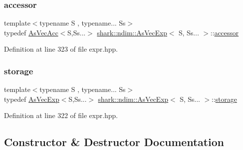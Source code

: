 \subsubsection{\texorpdfstring{accessor}{accessor}}
{\footnotesize\ttfamily template$<$typename S , typename... Ss$>$ \\
typedef \hyperlink{classshark_1_1ndim_1_1_as_vec_acc}{As\+Vec\+Acc}$<$S,Ss...$>$ \hyperlink{classshark_1_1ndim_1_1_as_vec_exp}{shark\+::ndim\+::\+As\+Vec\+Exp}$<$ S, Ss... $>$\+::\hyperlink{classshark_1_1ndim_1_1_as_vec_exp_3_01_s_00_01_ss_8_8_8_01_4_a60c74eff0990f421ce075603e7ed320f}{accessor}}



Definition at line 323 of file expr.\+hpp.

\hypertarget{classshark_1_1ndim_1_1_as_vec_exp_3_01_s_00_01_ss_8_8_8_01_4_a8c5a4772eb60d44a64f47d14a1f6d17a}{}\label{classshark_1_1ndim_1_1_as_vec_exp_3_01_s_00_01_ss_8_8_8_01_4_a8c5a4772eb60d44a64f47d14a1f6d17a} 
\subsubsection{\texorpdfstring{storage}{storage}}
{\footnotesize\ttfamily template$<$typename S , typename... Ss$>$ \\
typedef \hyperlink{classshark_1_1ndim_1_1_as_vec_exp}{As\+Vec\+Exp}$<$S,Ss...$>$ \hyperlink{classshark_1_1ndim_1_1_as_vec_exp}{shark\+::ndim\+::\+As\+Vec\+Exp}$<$ S, Ss... $>$\+::\hyperlink{classshark_1_1ndim_1_1_as_vec_exp_3_01_s_00_01_ss_8_8_8_01_4_a8c5a4772eb60d44a64f47d14a1f6d17a}{storage}}



Definition at line 322 of file expr.\+hpp.



\subsection{Constructor \& Destructor Documentation}
\hypertarget{classshark_1_1ndim_1_1_as_vec_exp_3_01_s_00_01_ss_8_8_8_01_4_a80abc377b58a39d01b8567ff281ac77f}{}\label{classshark_1_1ndim_1_1_as_vec_exp_3_01_s_00_01_ss_8_8_8_01_4_a80abc377b58a39d01b8567ff281ac77f} 
